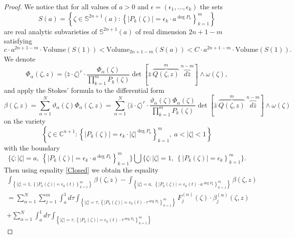 \documentclass[11pt,reqno]{amsart}
\numberwithin{equation}{section}
\begin{document}
\begin{proof} We notice that for all values of $a>0$
and $\epsilon=\left(\epsilon_1,\dots,\epsilon_k\right)$ the sets
$$S( a)=\left\{\zeta\in {{\mathbb S}}^{2n+1}(a):
\left\{ \left|P_k(\zeta)\right|=\epsilon_k\cdot a^{\deg P_k}\right\}_{k=1}^m\right\}$$
are real analytic subvarieties of ${{\mathbb S}}^{2n+1}(a)$ of real dimension $2n+1-m$
satisfying
\begin{equation}\label{VolumeEstimate}
c\cdot a^{2n+1-m}\cdot\text{Volume}\left(S(1)\right)
<\text{Volume}_{2n+1-m}\left(S(a)\right)
<C\cdot a^{2n+1-m}\cdot\text{Volume}\left(S(1)\right).
\end{equation}
\indent
We denote
$$\Phi_{\alpha}(\zeta,z)=\langle{\bar z}\cdot\zeta\rangle^r\cdot
\frac{\Phi_{\alpha}(\zeta)}{\prod_{k=1}^mP_k(\zeta)}
\det\left[{\bar z}\ \overbrace{Q(\zeta,z)}^{m}\ \overbrace{d{\bar z}}^{n-m}\right]
\wedge\omega(\zeta),$$
and apply the Stokes' formula to the differential form
\begin{equation}\label{betaform}
\beta(\zeta,z)=\sum_{\alpha=1}^N\vartheta_{\alpha}(\zeta)\Phi_{\alpha}(\zeta,z)
=\sum_{\alpha=1}^N\langle{\bar z}\cdot\zeta\rangle^r
\cdot\frac{\vartheta_{\alpha}(\zeta)\Phi_{\alpha}(\zeta)}
{\prod_{k=1}^mP_k(\zeta)}
\det\left[{\bar z}\ \overbrace{Q(\zeta,z)}^{m}\ \overbrace{d{\bar z}}^{n-m}\right]\wedge\omega(\zeta)
\end{equation}
on the variety
$$\left\{\zeta\in {{\mathbb C}}^{n+1}:
\left\{ \left|P_k(\zeta)\right|=\epsilon_k\cdot|\zeta|^{\deg P_k}\right\}_{k=1}^m,\
a<|\zeta|<1\right\}$$
with the boundary
\begin{equation*}
\Big\{\zeta:|\zeta|=a,\
\left\{|P_k(\zeta)|=\epsilon_k\cdot a^{\deg P_k}\right\}_{k=1}^m\Big\}
\bigcup\Big\{\zeta:|\zeta|=1,\ \left\{|P_k(\zeta)|=\epsilon_k\right\}_{k=1}^m\Big\}.
\end{equation*}
Then using equality \eqref{Closed}
we obtain the equality
\begin{multline}\label{epsilonStokes}
\int_{\left\{|\zeta|=1, \left\{|P_k(\zeta)|=\epsilon_k(t)\right\}_{k=1}^m\right\}}\beta(\zeta,z)
-\int_{\left\{|\zeta|=a,\
\left\{|P_k(\zeta)|=\epsilon_k(t)\cdot a^{\deg P_k}\right\}_{k=1}^m\right\}}\beta(\zeta,z)\\
=\sum_{\alpha=1}^N\sum_{j=1}^m\int_{a}^1d\tau
\int_{\left\{|\zeta|=\tau, \left\{|P_k(\zeta)|=\epsilon_k(t)\cdot\tau^{\deg P_k}\right\}_{k=1}^m\right\}}
F^{(\alpha)}_j(\zeta)\cdot\beta_j^{(\alpha)}(\zeta,z)\\
+\sum_{\alpha=1}^N\int_{a}^1d\tau
\int_{\left\{|\zeta|=\tau, \left\{|P_k(\zeta)|=\epsilon_k(t)\cdot\tau^{\deg P_k}\right\}_{k=1}^m\right\}}

\end{multline}
\end{proof}
\end{document}
